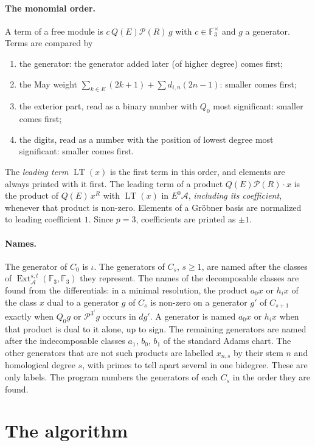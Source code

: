 \documentclass[11pt]{article}
\renewcommand{\P}{\mathcal{P}}
\newcommand{\F}{\mathbb{F}_3}
\newcommand{\A}{\mathcal{A}}
\DeclareMathOperator{\LT}{LT}
\DeclareMathOperator{\Ext}{Ext}
\begin{document}
\paragraph{The monomial order.}
A term of a free module is $c\, Q(E)\P(R)\, g$ with $c \in \F^\times$ and $g$ a generator.
Terms are compared by
\begin{enumerate}
\item the generator: the generator added later (of higher degree) comes first;
\item the May weight $\sum_{k \in E}(2k+1) + \sum d_{i,n}(2n - 1)$: smaller comes first;
\item the exterior part, read as a binary number with $Q_0$ most significant: smaller comes
  first;
\item the digits, read as a number with the position of lowest degree most significant:
  smaller comes first.
\end{enumerate}
The \emph{leading term} $\LT(x)$ is the first term in this order, and elements are always
printed with it first. The leading term of a product $Q(E)\P(R)\cdot x$ is the product of
$Q(E)\,x^R$ with $\LT(x)$ in $E^0\A$, \emph{including its coefficient}, whenever that product
is non-zero. Elements of a Gröbner basis are normalized to leading coefficient $1$. Since
$p = 3$, coefficients are printed as $\pm 1$.

\paragraph{Names.}
The generator of $C_0$ is $\iota$. The generators of $C_s$, $s \ge 1$, are named after the
classes of $\Ext_\A^{s,t}(\F, \F)$ they represent. The names of the decomposable classes are
found from the differentials: in a minimal resolution, the product $a_0 x$ or $h_i x$ of the
class $x$ dual to a generator $g$ of $C_s$ is non-zero on a generator $g'$ of $C_{s+1}$ exactly
when $Q_0 g$ or $\P^{3^i} g$ occurs in $d g'$. A generator is named $a_0 x$ or $h_i x$ when that
product is dual to it alone, up to sign. The remaining generators are named after the indecomposable classes $a_1$, $b_0$, $b_1$ of the standard Adams chart. The other generators that are not such products are labelled $x_{n,s}$ by their stem $n$ and homological degree $s$, with primes to tell apart several in one bidegree.
These are only labels. The program numbers the generators of each $C_s$ in the order they are
found.

\section{The algorithm}
\end{document}
